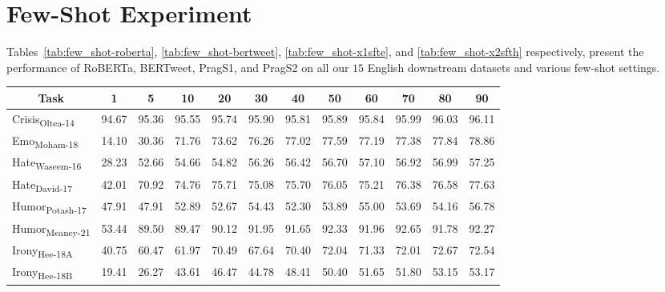 \section{Few-Shot Experiment}\label{sec:append_fewshot}
 Tables~\ref{tab:few_shot-roberta}, \ref{tab:few_shot-bertweet}, \ref{tab:few_shot-x1sfte}, and \ref{tab:few_shot-x2sfth} respectively, present the performance of RoBERTa, BERTweet, PragS1, and PragS2 on all our $15$ English downstream datasets and various few-shot settings.

\begin{table*}[ht]
\small
\centering
\begin{tabular}{@{}lccccccccccc@{}}
\toprule
\multicolumn{1}{c}{\textbf{Task}}                & \textbf{1} & \textbf{5} & \textbf{10} & \textbf{20} & \textbf{30} & \textbf{40} & \textbf{50} & \textbf{60} & \textbf{70} & \textbf{80} & \textbf{90} \\ \midrule
Crisis\textsubscript{Oltea-14}  & 94.67      & 95.36      & 95.55       & 95.74       & 95.90       & 95.81       & 95.89       & 95.84       & 95.99       & 96.03       & 96.11       \\
Emo\textsubscript{Moham-18}     & 14.10      & 30.36      & 71.76       & 73.62       & 76.26       & 77.02       & 77.59       & 77.19       & 77.38       & 77.84       & 78.86       \\
Hate\textsubscript{Waseem-16}   & 28.23      & 52.66      & 54.66       & 54.82       & 56.26       & 56.42       & 56.70       & 57.10       & 56.92       & 56.99       & 57.25       \\
Hate\textsubscript{David-17}    & 42.01      & 70.92      & 74.76       & 75.71       & 75.08       & 75.70       & 76.05       & 75.21       & 76.38       & 76.58       & 77.63       \\
Humor\textsubscript{Potash-17}  & 47.91      & 47.91      & 52.89       & 52.67       & 54.43       & 52.30       & 53.89       & 55.00       & 53.69       & 54.16       & 56.78       \\
Humor\textsubscript{Meaney-21}  & 53.44      & 89.50      & 89.47       & 90.12       & 91.95       & 91.65       & 92.33       & 91.96       & 92.65       & 91.78       & 92.27       \\
Irony\textsubscript{Hee-18A}    & 40.75      & 60.47      & 61.97       & 70.49       & 67.64       & 70.40       & 72.04       & 71.33       & 72.01       & 72.67       & 72.54       \\
Irony\textsubscript{Hee-18B}    & 19.41      & 26.27      & 43.61       & 46.47       & 44.78       & 48.41       & 50.40       & 51.65       & 51.80       & 53.15       & 53.17       \\

\end{tabular}
\end{table*}
